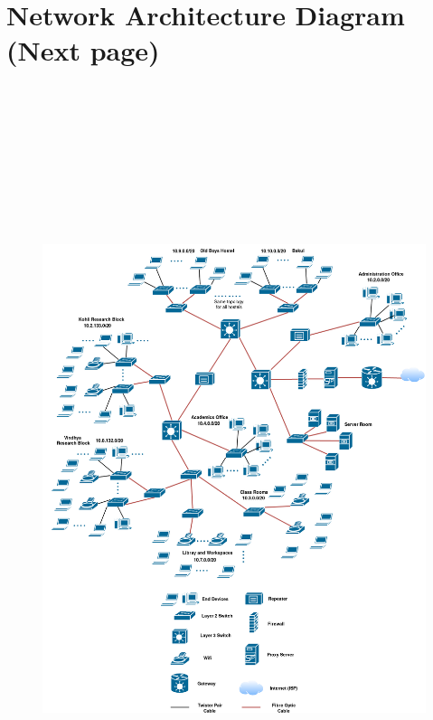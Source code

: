 \documentclass{article}
\begin{document}
\section{Network Architecture Diagram (Next page)}
\pagebreak
\begin{figure}[htb]
	\includegraphics[width=16.5cm,height=23cm]{CampusLan_Final.png}
\end{figure}
\end{document}
